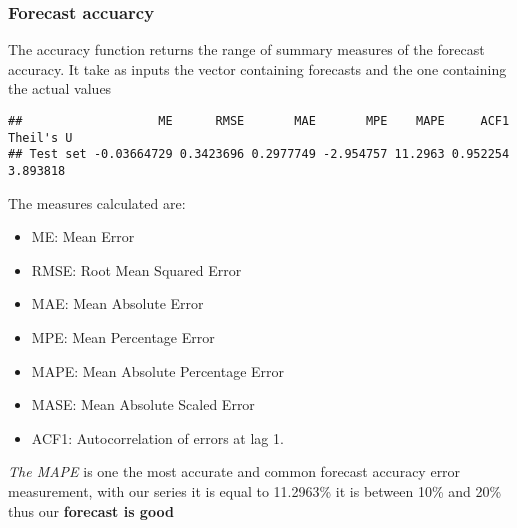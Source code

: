 \documentclass[
]{article}
\newenvironment{Shaded}{\begin{snugshade}}{\end{snugshade}}
\newcommand{\FunctionTok}[1]{\textcolor[rgb]{0.00,0.00,0.00}{#1}}
\newcommand{\NormalTok}[1]{#1}
\newcommand{\SpecialCharTok}[1]{\textcolor[rgb]{0.00,0.00,0.00}{#1}}
\begin{document}
\hypertarget{forecast-accuarcy}{%
\subsubsection{Forecast accuarcy}\label{forecast-accuarcy}}

The accuracy function returns the range of summary measures of the
forecast accuracy. It take as inputs the vector containing forecasts and
the one containing the actual values

\begin{Shaded}
\end{Shaded}

\begin{verbatim}
##                   ME      RMSE       MAE       MPE    MAPE     ACF1 Theil's U
## Test set -0.03664729 0.3423696 0.2977749 -2.954757 11.2963 0.952254  3.893818
\end{verbatim}

The measures calculated are:

\begin{itemize}
\item
  ME: Mean Error
\item
  RMSE: Root Mean Squared Error
\item
  MAE: Mean Absolute Error
\item
  MPE: Mean Percentage Error
\item
  MAPE: Mean Absolute Percentage Error
\item
  MASE: Mean Absolute Scaled Error
\item
  ACF1: Autocorrelation of errors at lag 1.
\end{itemize}

\emph{The MAPE} is one the most accurate and common forecast accuracy
error measurement, with our series it is equal to 11.2963\% it is
between 10\% and 20\% thus our \textbf{forecast is good}
\end{document}
